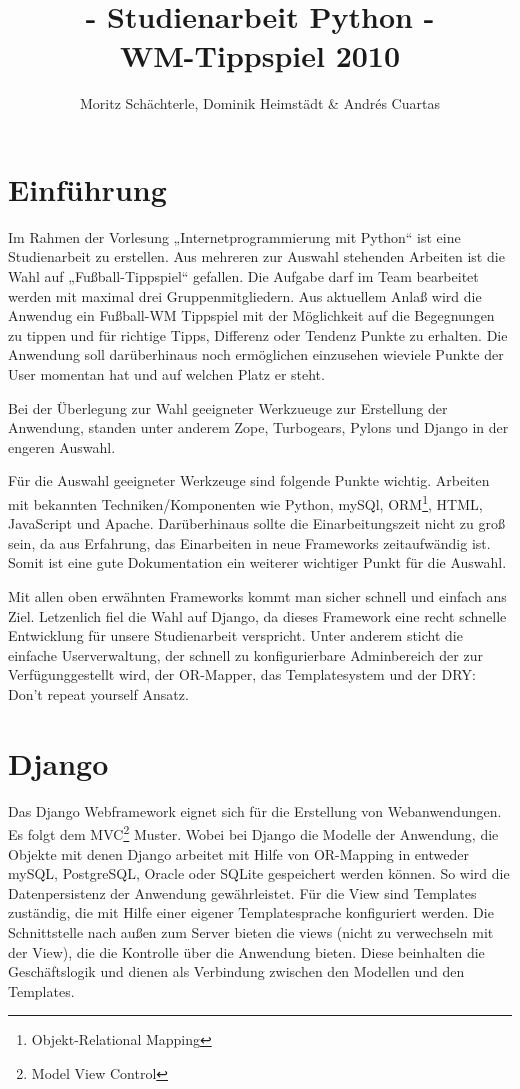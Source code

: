 \documentclass[titlepage, 12pt,a4paper]{scrartcl}
\author{Moritz Schächterle, Dominik Heimstädt \& Andrés Cuartas}
\title{- Studienarbeit Python - \\ WM-Tippspiel 2010 \\}
\begin{document}
\maketitle
\newpage

\tableofcontents
\newpage

\section{Einführung}
Im Rahmen der Vorlesung „Internetprogrammierung mit Python“ ist eine
Studienarbeit zu erstellen. Aus mehreren zur Auswahl stehenden Arbeiten ist die
Wahl auf „Fußball-Tippspiel“ gefallen. Die Aufgabe darf im Team bearbeitet
werden mit maximal drei Gruppenmitgliedern. Aus aktuellem Anlaß wird die
Anwendug ein Fußball-WM Tippspiel mit der Möglichkeit auf die Begegnungen zu
tippen und für richtige Tipps, Differenz oder Tendenz Punkte zu erhalten. Die
Anwendung soll darüberhinaus noch ermöglichen einzusehen wieviele Punkte der
User momentan hat und auf welchen Platz er steht.

Bei der Überlegung zur Wahl geeigneter Werkzueuge zur Erstellung der Anwendung,
standen unter anderem Zope, Turbogears, Pylons und Django in der engeren
Auswahl.

Für die Auswahl geeigneter Werkzeuge sind folgende Punkte wichtig.
Arbeiten mit bekannten Techniken/Komponenten wie Python, mySQl,
ORM\footnote{Objekt-Relational Mapping}, HTML, JavaScript und Apache. 
Darüberhinaus sollte die Einarbeitungszeit nicht zu groß sein, da aus
Erfahrung, das Einarbeiten in neue Frameworks zeitaufwändig ist. Somit ist eine
gute Dokumentation ein weiterer wichtiger Punkt für die Auswahl.

Mit allen oben erwähnten Frameworks kommt man sicher schnell und einfach ans
Ziel. Letzenlich fiel die Wahl auf Django, da dieses Framework eine recht
schnelle Entwicklung für unsere Studienarbeit verspricht. Unter anderem sticht
die einfache Userverwaltung, der schnell zu konfigurierbare Adminbereich der
zur Verfügunggestellt wird, der OR-Mapper, das Templatesystem und der DRY: Don't
repeat yourself Ansatz. 

\section{Django}
Das Django Webframework eignet sich für die Erstellung von Webanwendungen. Es
folgt dem MVC\footnote{Model View Control} Muster. Wobei bei Django die Modelle
der Anwendung, die Objekte mit denen Django arbeitet mit Hilfe von OR-Mapping
in entweder mySQL, PostgreSQL, Oracle oder SQLite gespeichert werden können. So
wird die Datenpersistenz der Anwendung gewährleistet. Für die View sind
Templates zuständig, die mit Hilfe einer eigener Templatesprache konfiguriert
werden. Die Schnittstelle nach außen zum Server bieten die views (nicht zu
verwechseln mit der View), die die Kontrolle über die Anwendung bieten. Diese
beinhalten die Geschäftslogik und dienen als Verbindung zwischen den Modellen
und den Templates.
\end{document}
